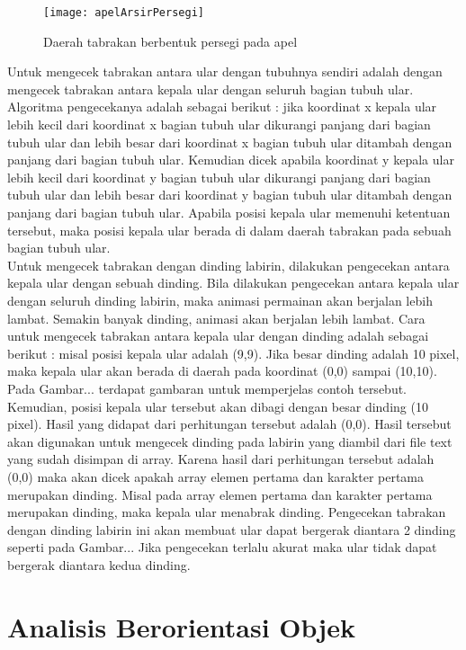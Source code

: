 \begin{figure}[H]
	\centering  
	\texttt{[image: apelArsirPersegi]}  
	\caption[Daerah tabrakan berbentuk persegi pada apel]{Daerah tabrakan berbentuk persegi pada apel}
	\label{fig:apelArsirPersegi} 
\end{figure}

Untuk mengecek tabrakan antara ular dengan tubuhnya sendiri adalah dengan mengecek tabrakan antara kepala ular dengan seluruh bagian tubuh ular. Algoritma pengecekanya adalah sebagai berikut : jika koordinat x kepala ular lebih kecil dari koordinat x bagian tubuh ular dikurangi panjang dari bagian tubuh ular dan lebih besar dari koordinat x bagian tubuh ular ditambah dengan panjang dari bagian tubuh ular. Kemudian dicek apabila koordinat y kepala ular lebih kecil dari koordinat y bagian tubuh ular dikurangi panjang dari bagian tubuh ular dan lebih besar dari koordinat y bagian tubuh ular ditambah dengan panjang dari bagian tubuh ular. Apabila posisi kepala ular memenuhi ketentuan tersebut, maka posisi kepala ular berada di dalam daerah tabrakan pada sebuah bagian tubuh ular. \\

Untuk mengecek tabrakan dengan dinding labirin, dilakukan pengecekan antara kepala ular dengan sebuah dinding. Bila dilakukan pengecekan antara kepala ular dengan seluruh dinding labirin, maka animasi permainan akan berjalan lebih lambat. Semakin banyak dinding, animasi akan berjalan lebih lambat. Cara untuk mengecek tabrakan antara kepala ular dengan dinding adalah sebagai berikut : misal posisi kepala ular adalah (9,9). Jika besar dinding adalah 10 pixel, maka kepala ular akan berada di daerah pada koordinat (0,0) sampai (10,10). Pada Gambar... terdapat gambaran untuk memperjelas contoh tersebut. Kemudian, posisi kepala ular tersebut akan dibagi dengan besar dinding (10 pixel). Hasil yang didapat dari perhitungan tersebut adalah (0,0). Hasil tersebut akan digunakan untuk mengecek dinding pada labirin yang diambil dari file text yang sudah disimpan di array. Karena hasil dari perhitungan tersebut adalah (0,0) maka akan dicek apakah array elemen pertama dan karakter pertama merupakan dinding. Misal pada array elemen pertama dan karakter pertama merupakan dinding, maka kepala ular menabrak dinding. Pengecekan tabrakan dengan dinding labirin ini akan membuat ular dapat bergerak diantara 2 dinding seperti pada Gambar... Jika pengecekan terlalu akurat maka ular tidak dapat bergerak diantara kedua dinding. 

\section{Analisis Berorientasi Objek}

